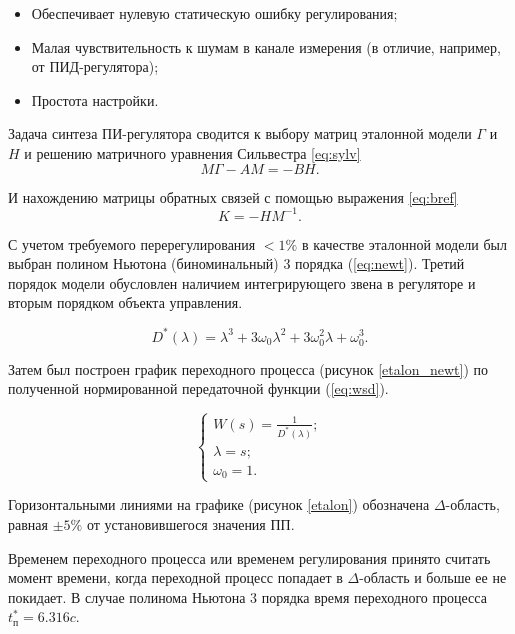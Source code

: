 \begin{itemize}
  \item Обеспечивает нулевую статическую ошибку регулирования;
  \item Малая чувствительность к шумам в канале измерения (в отличие, например, от ПИД-регулятора);
  \item Простота настройки.
\end{itemize}

Задача синтеза ПИ-регулятора сводится к выбору матриц эталонной модели $\Gamma$ и $H$ и 
решению матричного уравнения Сильвестра \ref{eq:sylv}\cite{ЦифУправление}
\begin{equation}
  M\Gamma-AM=-BH.
  \label{eq:sylv}
\end{equation}

И нахождению матрицы обратных связей с помощью выражения \ref{eq:bref}
\begin{equation}
  K = -HM^{-1}.
  \label{eq:bref}
\end{equation}

С учетом требуемого перерегулирования $<1\%$ в качестве эталонной модели был выбран 
полином Ньютона (биноминальный) 3 порядка (\ref{eq:newt})\cite{МодальноеУправление}. Третий порядок
модели обусловлен наличием интегрирующего звена в регуляторе и вторым порядком
объекта управления.

\begin{equation}
  D^{\text{*}}(\lambda)=\lambda^3+3\omega_0\lambda^2+3\omega_0^2\lambda+\omega_0^3.
  \label{eq:newt}
\end{equation}

Затем был построен график переходного процесса (рисунок \ref{etalon_newt}) по полученной нормированной 
передаточной функции (\ref{eq:wsd}).

\begin{equation}
  \begin{cases}
    W(s)=\frac{1}{D^{\text{*}}(\lambda)};
    \\
    \lambda=s;
    \\
    \omega_0=1.
  \end{cases}
  \label{eq:wsd}
\end{equation}

Горизонтальными линиями на графике (рисунок \ref{etalon}) обозначена $\Delta$-область, равная
$\pm5\%$ от установившегося значения ПП.

Временем переходного процесса или временем регулирования принято считать момент времени, когда
переходной процесс попадает в $\Delta$-область и больше ее не покидает. В случае полинома Ньютона
3 порядка время переходного процесса $t_{\text{п}}^{\text{*}}=6.316 c$.

